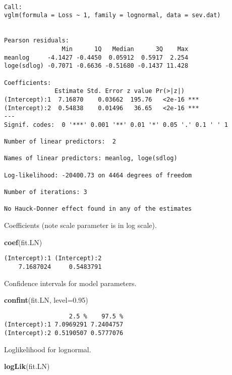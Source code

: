 \documentclass[]{book}
\newenvironment{Shaded}{\begin{snugshade}}{\end{snugshade}}
\newcommand{\KeywordTok}[1]{\textcolor[rgb]{0.13,0.29,0.53}{\textbf{#1}}}
\newcommand{\DataTypeTok}[1]{\textcolor[rgb]{0.13,0.29,0.53}{#1}}
\newcommand{\FloatTok}[1]{\textcolor[rgb]{0.00,0.00,0.81}{#1}}
\newcommand{\NormalTok}[1]{#1}
\theoremstyle{definition}
\theoremstyle{definition}
\theoremstyle{definition}
\theoremstyle{remark}
\begin{document}
\begin{verbatim}

Call:
vglm(formula = Loss ~ 1, family = lognormal, data = sev.dat)


Pearson residuals:
                Min      1Q   Median      3Q    Max
meanlog     -4.1427 -0.4450  0.05912  0.5917  2.254
loge(sdlog) -0.7071 -0.6636 -0.51680 -0.1437 11.428

Coefficients: 
              Estimate Std. Error z value Pr(>|z|)    
(Intercept):1  7.16870    0.03662  195.76   <2e-16 ***
(Intercept):2  0.54838    0.01496   36.65   <2e-16 ***
---
Signif. codes:  0 '***' 0.001 '**' 0.01 '*' 0.05 '.' 0.1 ' ' 1

Number of linear predictors:  2 

Names of linear predictors: meanlog, loge(sdlog)

Log-likelihood: -20400.73 on 4464 degrees of freedom

Number of iterations: 3 

No Hauck-Donner effect found in any of the estimates
\end{verbatim}

Coefficients (note scale parameter is in log scale).

\begin{Shaded}
\begin{Highlighting}[]
\KeywordTok{coef}\NormalTok{(fit.LN)                }
\end{Highlighting}
\end{Shaded}

\begin{verbatim}
(Intercept):1 (Intercept):2 
    7.1687024     0.5483791 
\end{verbatim}

Confidence intervals for model parameters.

\begin{Shaded}
\begin{Highlighting}[]
\KeywordTok{confint}\NormalTok{(fit.LN, }\DataTypeTok{level=}\FloatTok{0.95}\NormalTok{)   }
\end{Highlighting}
\end{Shaded}

\begin{verbatim}
                  2.5 %    97.5 %
(Intercept):1 7.0969291 7.2404757
(Intercept):2 0.5190507 0.5777076
\end{verbatim}

Loglikelihood for lognormal.

\begin{Shaded}
\begin{Highlighting}[]
\KeywordTok{logLik}\NormalTok{(fit.LN)               }
\end{Highlighting}
\end{Shaded}
\end{document}
